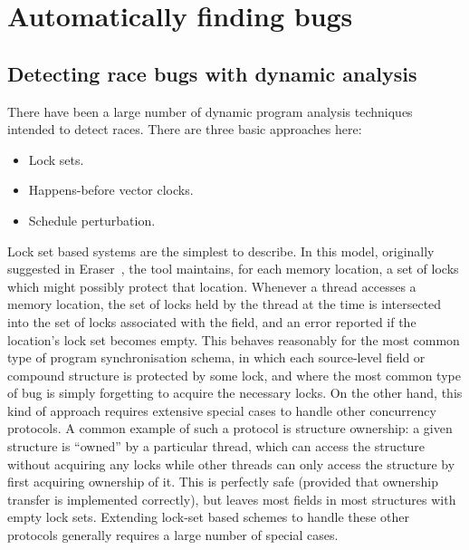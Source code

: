 \label{chapter:related_work}

\section{Automatically finding bugs}

\subsection{Detecting race bugs with dynamic analysis}

There have been a large number of dynamic program analysis techniques
intended to detect races.  There are three basic approaches here:

\begin{itemize}
\item Lock sets.
\item Happens-before vector clocks.
\item Schedule perturbation.
\end{itemize}

Lock set based systems are the simplest to describe.  In this model,
originally suggested in Eraser~\cite{Savage1997}, the tool maintains,
for each memory location, a set of locks which might possibly protect
that location.  Whenever a thread accesses a memory location, the set
of locks held by the thread at the time is intersected into the set of
locks associated with the field, and an error reported if the
location's lock set becomes empty.  This behaves reasonably for the
most common type of program synchronisation schema, in which each
source-level field or compound structure is protected by some lock,
and where the most common type of bug is simply forgetting to acquire
the necessary locks.  On the other hand, this kind of approach
requires extensive special cases to handle other concurrency
protocols.  A common example of such a protocol is structure
ownership: a given structure is ``owned'' by a particular thread,
which can access the structure without acquiring any locks while other
threads can only access the structure by first acquiring ownership of
it.  This is perfectly safe (provided that
ownership transfer is implemented correctly), but leaves most fields
in most structures with empty lock sets.  Extending lock-set based
schemes to handle these other protocols generally requires a large
number of special cases.

